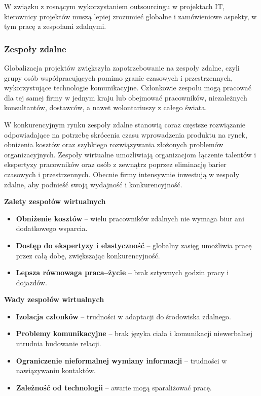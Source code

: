 W związku z rosnącym wykorzystaniem outsourcingu w projektach IT, kierownicy projektów muszą lepiej zrozumieć globalne i zamówieniowe aspekty, w tym pracę z zespołami zdalnymi. \autocite{ITPM}  

\subsubsection{Zespoły zdalne}
Globalizacja projektów zwiększyła zapotrzebowanie na zespoły zdalne, \autocite{pmbok6} czyli grupy osób współpracujących pomimo granic czasowych i przestrzennych, wykorzystujące technologie komunikacyjne. Członkowie zespołu mogą pracować dla tej samej firmy w jednym kraju lub obejmować pracowników, niezależnych konsultantów, dostawców, a nawet wolontariuszy z całego świata. \autocite{ITPM}

W konkurencyjnym rynku zespoły zdalne stanowią coraz częstsze rozwiązanie odpowiadające na potrzebę skrócenia czasu wprowadzenia produktu na rynek, obniżenia kosztów oraz szybkiego rozwiązywania złożonych problemów organizacyjnych. Zespoły wirtualne umożliwiają organizacjom łączenie talentów i ekspertyzy pracowników oraz osób z zewnątrz poprzez eliminację barier czasowych i przestrzennych. Obecnie firmy intensywnie inwestują w zespoły zdalne, aby podnieść swoją wydajność i konkurencyjność. \autocite{ebrahim2009virtual}

\textbf{Zalety zespołów wirtualnych}  
\begin{itemize}
  \item \textbf{Obniżenie kosztów} – wielu pracowników zdalnych nie wymaga biur ani dodatkowego wsparcia.
  \item \textbf{Dostęp do ekspertyzy i elastyczność} – globalny zasięg umożliwia pracę przez całą dobę, zwiększając konkurencyjność.
  \item \textbf{Lepsza równowaga praca–życie} – brak sztywnych godzin pracy i dojazdów.
\end{itemize}

\textbf{Wady zespołów wirtualnych}  
\begin{itemize}
  \item \textbf{Izolacja członków} – trudności w adaptacji do środowiska zdalnego.
  \item \textbf{Problemy komunikacyjne} – brak języka ciała i komunikacji niewerbalnej utrudnia budowanie relacji.
  \item \textbf{Ograniczenie nieformalnej wymiany informacji} – trudności w nawiązywaniu kontaktów.
  \item \textbf{Zależność od technologii} – awarie mogą sparaliżować pracę.
\end{itemize}


